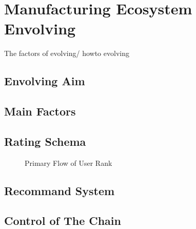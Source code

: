 \section{Manufacturing Ecosystem Envolving} %
\label{sec:envolve}
The factors of evolving/ howto evolving

\subsection{Envolving Aim} %
\label{sub:envolving_aim}

\subsection{Main Factors} %
\label{sub:main_factors}


\subsection{Rating Schema} %
\label{sub:rating_schema}

\begin{figure}[!h]
\centering\small
\resizebox{0.6\textwidth}{!}{}
\caption{Primary Flow of User Rank}
\label{fig:userrank}
\end{figure}

\subsection{Recommand System} %
\label{sub:recommand_system}


\subsection{Control of The Chain} %
\label{sub:control}

